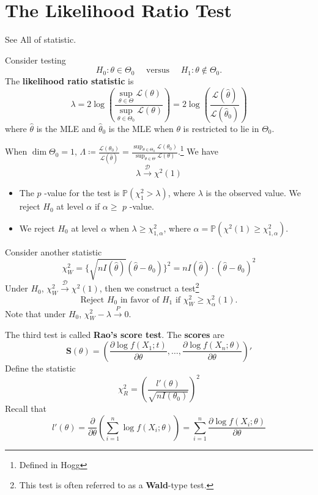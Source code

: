 \section{The Likelihood Ratio Test}

See All of statistic.

\begin{definition}
Consider testing
\[
H_0: \theta \in \Theta_0 \quad \text { versus } \quad H_1: \theta \notin \Theta_0 .
\]The \textbf{likelihood ratio statistic} is
\[
\lambda=2 \log \left(\frac{\sup _{\theta \in \Theta} \mathcal{L}(\theta)}{\sup _{\theta \in \Theta_0} \mathcal{L}(\theta)}\right)=2 \log \left(\frac{\mathcal{L}(\widehat{\theta})}{\mathcal{L}\left(\widehat{\theta}_0\right)}\right)
\]where $\widehat{\theta}$ is the MLE and $\widehat{\theta}_0$ is the MLE when $\theta$ is restricted to lie in $\Theta_0$.
\end{definition}
When $\dim\Theta_0=1$, $\Lambda\coloneqq\frac{\mathcal{L}(\theta_0)}{\mathcal{L}(\widehat{\theta})}=\frac{\sup_{\theta\in\Theta_0}\mathcal{L}(\theta_0)}{\sup_{\theta\in\Theta}\mathcal{L}(\theta)}$.\footnote{Defined in Hogg} We have
\[
\lambda\overset{ \mathcal{D} }{ \to }\chi^{2}(1)
\]
\begin{itemize}
	\item The $p$ -value for the test is $\mathbb{P}(\chi^{2}_{1}>\lambda)$, where $\lambda$ is the observed value. We reject $H_0$ at level $\alpha$ if $\alpha\geq$ $p$ -value.
	\item We reject $H_0$ at level $\alpha$ when $\lambda\geq \chi^{2}_{1,\alpha}$, where $\alpha=\mathbb{P}(\chi^{2}(1)\geq\chi^{2}_{1,\alpha})$.
\end{itemize}

Consider another statistic
\[
\chi^{2}_{W}=\{ \sqrt{ nI(\widehat{\theta}) }(\widehat{\theta}-\theta_0) \}^{2}=nI(\widehat{\theta})\cdot(\widehat{\theta}-\theta_0)^2
\]
Under $H_0$, $\chi^{2}_{W}\overset{ \mathcal{D} }{ \to }\chi^{2}(1)$, then we construct a test\footnote{This test is often referred to as a \textbf{Wald}-type test.}
\[
\text { Reject } H_0 \text { in favor of } H_1 \text { if } \chi_W^2 \geq \chi_\alpha^2(1) \text {. }
\]
Note that under $H_0$, $\chi^{2}_{W}-\lambda\overset{ P }{ \to }0$.

The third test is called \textbf{Rao's score test}. The \textbf{scores} are
\[
\mathbf{S}(\theta)=\left( \frac{ \partial \log f(X_1;t) }{ \partial \theta } ,\dots,\frac{ \partial \log f(X_n;\theta) }{ \partial \theta }  \right)'
\]
Define the statistic
\[
\chi^{2}_{R}=\left( \frac{l'(\theta)}{\sqrt{ nI(\theta_0) }} \right)^2
\]
Recall that
\[
l'(\theta)=\frac{ \partial   }{ \partial \theta } \left( \sum_{i=1}^{n} \log f(X_i;\theta) \right)=\sum_{i=1}^{n} \frac{ \partial \log f(X_i;\theta) }{ \partial \theta }
\]
